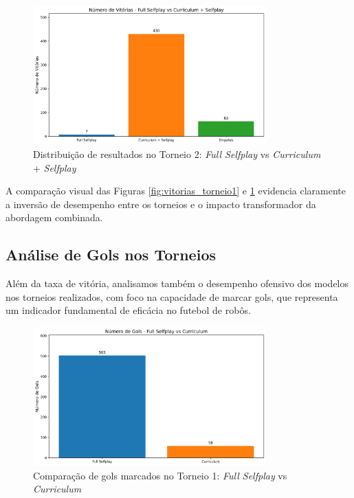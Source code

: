 \begin{figure}[H]
    \centering
    \includegraphics[width=0.8\textwidth]{fig/graficos_trabalho/graficos_torneios/torneios/vitorias_full_selfplay_vs_curriculum_+_selfplay.png}
    \caption{Distribuição de resultados no Torneio 2: \textit{Full Selfplay} vs \textit{Curriculum} + \textit{Selfplay}}
    \label{fig:vitorias_torneio2}
\end{figure}

A comparação visual das Figuras \ref{fig:vitorias_torneio1} e \ref{fig:vitorias_torneio2} evidencia claramente a inversão de desempenho entre os torneios e o impacto transformador da abordagem combinada.

\subsection{Análise de Gols nos Torneios}

Além da taxa de vitória, analisamos também o desempenho ofensivo dos modelos nos torneios realizados, com foco na capacidade de marcar gols, que representa um indicador fundamental de eficácia no futebol de robôs.

\begin{figure}[H]
    \centering
    \includegraphics[width=0.8\textwidth]{fig/graficos_trabalho/graficos_torneios/torneios/gols_full_selfplay_vs_curriculum.png}
    \caption{Comparação de gols marcados no Torneio 1: \textit{Full Selfplay} vs \textit{Curriculum}}
    \label{fig:gols_torneio1}
\end{figure}

